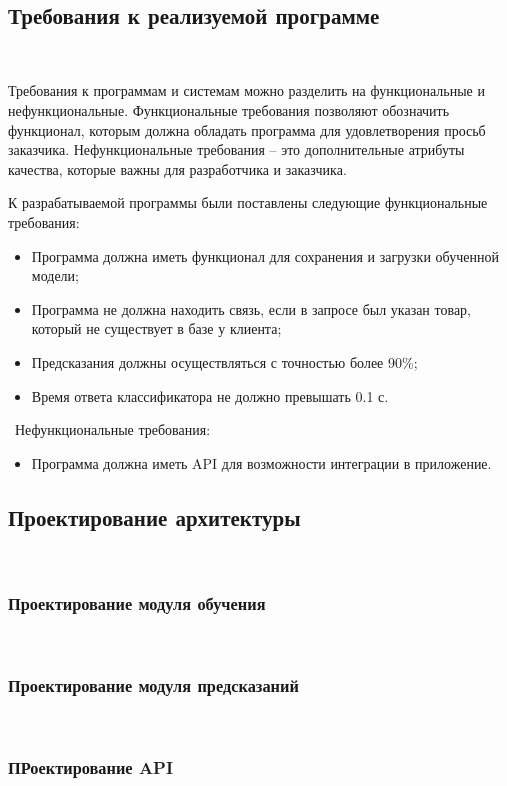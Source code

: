 \
\subsection{Требования к реализуемой программе}
\

Требования к программам и системам можно разделить на функциональные и нефункциональные. Функциональные требования позволяют обозначить функционал, которым должна обладать программа для удовлетворения просьб заказчика. Нефункциональные требования – это дополнительные атрибуты качества, которые важны для разработчика и заказчика.

К разрабатываемой программы были поставлены следующие функциональные требования:

\begin{itemize}
  \item Программа должна иметь функционал для сохранения и загрузки обученной модели;
  \item Программа не должна находить связь, если в запросе был указан товар, который не существует в базе у клиента;
  \item Предсказания должны осуществляться с точностью более 90\%;
  \item Время ответа классификатора не должно превышать 0.1 с.
\end{itemize}

\
Нефункциональные требования:
\begin{itemize}
  \item Программа должна иметь API для возможности интеграции в приложение.
\end{itemize}

\newpage

\subsection{Проектирование архитектуры}
\


\subsubsection{Проектирование модуля обучения}
\
\subsubsection{Проектирование модуля предсказаний}
\
\subsubsection{ПРоектирование API}

\newpage